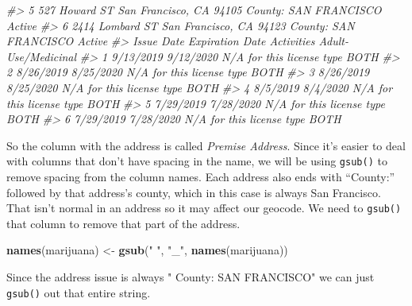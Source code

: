 \documentclass[
  12pt,
]{book}
\newenvironment{Shaded}{\begin{snugshade}}{\end{snugshade}}
\newcommand{\CommentTok}[1]{\textcolor[rgb]{0.37,0.37,0.37}{\textit{#1}}}
\newcommand{\KeywordTok}[1]{\textcolor[rgb]{0.27,0.27,0.27}{\textbf{#1}}}
\newcommand{\NormalTok}[1]{#1}
\newcommand{\OperatorTok}[1]{\textcolor[rgb]{0.43,0.43,0.43}{\textbf{#1}}}
\newcommand{\StringTok}[1]{\textcolor[rgb]{0.5,0.5,0.5}{#1}}
\begin{document}
\begin{Shaded}
\begin{Highlighting}[]
\CommentTok{\#> 5   527 Howard ST San Francisco, CA 94105 County: SAN FRANCISCO Active}
\CommentTok{\#> 6 2414 Lombard ST San Francisco, CA 94123 County: SAN FRANCISCO Active}
\CommentTok{\#>   Issue Date Expiration Date                Activities Adult{-}Use/Medicinal}
\CommentTok{\#> 1  9/13/2019       9/12/2020 N/A for this license type                BOTH}
\CommentTok{\#> 2  8/26/2019       8/25/2020 N/A for this license type                BOTH}
\CommentTok{\#> 3  8/26/2019       8/25/2020 N/A for this license type                BOTH}
\CommentTok{\#> 4   8/5/2019        8/4/2020 N/A for this license type                BOTH}
\CommentTok{\#> 5  7/29/2019       7/28/2020 N/A for this license type                BOTH}
\CommentTok{\#> 6  7/29/2019       7/28/2020 N/A for this license type                BOTH}
\end{Highlighting}
\end{Shaded}

So the column with the address is called \emph{Premise Address}. Since it's easier to deal with columns that don't have spacing in the name, we will be using \texttt{gsub()} to remove spacing from the column names. Each address also ends with ``County:'' followed by that address's county, which in this case is always San Francisco. That isn't normal in an address so it may affect our geocode. We need to \texttt{gsub()} that column to remove that part of the address.

\begin{Shaded}
\begin{Highlighting}[]
\KeywordTok{names}\NormalTok{(marijuana) <{-}}\StringTok{ }\KeywordTok{gsub}\NormalTok{(}\StringTok{" "}\NormalTok{, }\StringTok{"\_"}\NormalTok{, }\KeywordTok{names}\NormalTok{(marijuana))}
\end{Highlighting}
\end{Shaded}

Since the address issue is always " County: SAN FRANCISCO" we can just \texttt{gsub()} out that entire string.

\begin{Shaded}
\end{Shaded}
\end{document}
